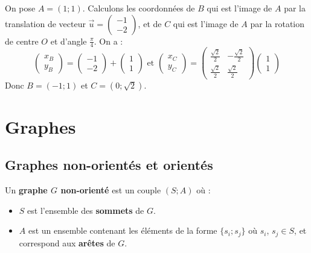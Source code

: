 	\begin{tip}[Exemple]
		On pose $A = (1; 1)$. Calculons les coordonnées de $B$ qui est l'image de $A$ par la translation de vecteur $\overrightarrow{u} = \begin{pmatrix} -1 \\ -2 \end{pmatrix}$, et de $C$ qui est l'image de $A$ par la rotation de centre $O$ et d'angle $\frac{\pi}{4}$.
		\newpar
		On a :
		\[ \begin{pmatrix} x_B \\ y_B \end{pmatrix} = \begin{pmatrix} -1 \\ -2 \end{pmatrix} + \begin{pmatrix} 1 \\ 1 \end{pmatrix} \text{ et } \begin{pmatrix} x_C \\ y_C \end{pmatrix} = \begin{pmatrix} \frac{\sqrt{2}}{2} & -\frac{\sqrt{2}}{2} \\ \frac{\sqrt{2}}{2} & \frac{\sqrt{2}}{2} \end{pmatrix} \begin{pmatrix} 1 \\ 1 \end{pmatrix} \]
		Donc $B = (-1; 1)$ et $C = (0; \sqrt{2})$.
	\end{tip}

	\section{Graphes}

	\subsection{Graphes non-orientés et orientés}

	\begin{formula}
		Un \textbf{graphe $G$ non-orienté} est un couple $(S; A)$ où :
		\begin{itemize}
			\item $S$ est l'ensemble des \textbf{sommets} de $G$.
			\item $A$ est un ensemble contenant les éléments de la forme $\{s_i; s_j\}$ où $s_i$, $s_j \in S$, et correspond aux \textbf{arêtes} de $G$.
		\end{itemize}
	\end{formula}

